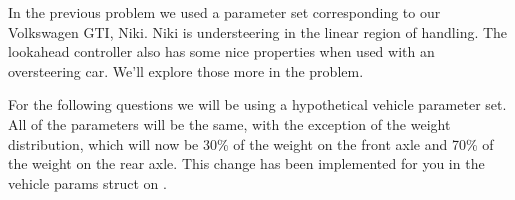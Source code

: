 
In the previous problem we used a parameter set corresponding to our Volkswagen GTI, Niki. Niki is understeering in the
linear region of handling. The lookahead controller also has some nice properties when used with an oversteering car.
We'll explore those more in the problem.

For the following questions we will be using a hypothetical vehicle parameter set. All of the parameters will be the
same, with the exception of the weight distribution, which will now be 30\% of the weight on the front axle and 70\% of
the weight on the rear axle. This change has been implemented for you in the vehicle params struct on \GRno{}.

\vspace*{0.5cm}
